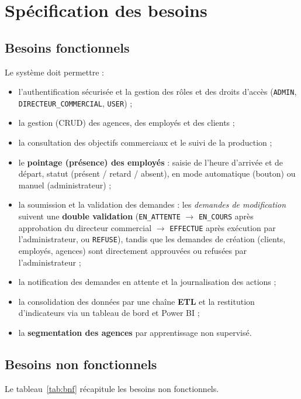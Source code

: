 \section{Spécification des besoins}

\subsection{Besoins fonctionnels}
Le système doit permettre :
\begin{itemize}[noitemsep]
  \item l'authentification sécurisée et la gestion des rôles et des droits
        d'accès (\texttt{ADMIN}, \texttt{DIRECTEUR\_COMMERCIAL}, \texttt{USER}) ;
  \item la gestion (CRUD) des agences, des employés et des clients ;
  \item la consultation des objectifs commerciaux et le suivi de la production ;
  \item le \textbf{pointage (présence) des employés} : saisie de l'heure d'arrivée
        et de départ, statut (présent / retard / absent), en mode automatique
        (bouton) ou manuel (administrateur) ;
  \item la soumission et la validation des demandes : les \emph{demandes de
        modification} suivent une \textbf{double validation}
        (\texttt{EN\_ATTENTE} $\rightarrow$ \texttt{EN\_COURS} après approbation
        du directeur commercial $\rightarrow$ \texttt{EFFECTUE} après exécution
        par l'administrateur, ou \texttt{REFUSE}), tandis que les demandes de
        création (clients, employés, agences) sont directement approuvées ou
        refusées par l'administrateur ;
  \item la notification des demandes en attente et la journalisation des actions ;
  \item la consolidation des données par une chaîne \textbf{ETL} et la restitution
        d'indicateurs via un tableau de bord et Power BI ;
  \item la \textbf{segmentation des agences} par apprentissage non supervisé.
\end{itemize}

\subsection{Besoins non fonctionnels}
Le tableau~\ref{tab:bnf} récapitule les besoins non fonctionnels.

